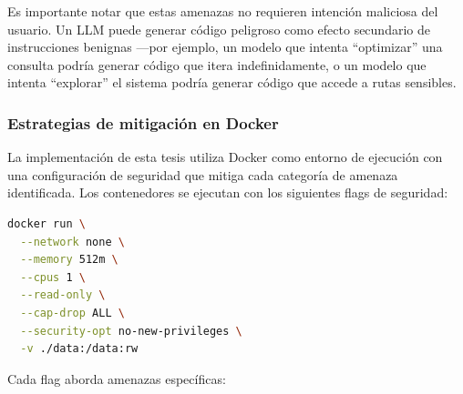 Es importante notar que estas amenazas no requieren intención maliciosa del
usuario. Un LLM puede generar código peligroso como efecto secundario de
instrucciones benignas ---por ejemplo, un modelo que intenta ``optimizar''
una consulta podría generar código que itera indefinidamente, o un modelo que
intenta ``explorar'' el sistema podría generar código que accede a rutas
sensibles.

\subsubsection{Estrategias de mitigación en Docker}

La implementación de esta tesis utiliza Docker como entorno de ejecución con
una configuración de seguridad que mitiga cada categoría de amenaza
identificada. Los contenedores se ejecutan con los siguientes flags de
seguridad:

\begin{lstlisting}[language=bash,caption={Flags de seguridad Docker utilizados en esta investigación}]
docker run \
  --network none \
  --memory 512m \
  --cpus 1 \
  --read-only \
  --cap-drop ALL \
  --security-opt no-new-privileges \
  -v ./data:/data:rw
\end{lstlisting}

Cada flag aborda amenazas específicas:


